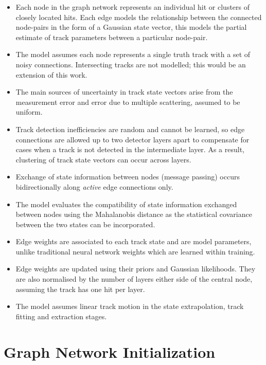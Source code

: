 \begin{itemize}
    \item Each node in the graph network represents an individual hit or clusters of closely located hits. Each edge models the relationship between the connected node-pairs in the form of a Gaussian state vector, this models the partial estimate of track parameters between a particular node-pair. 
    \item The model assumes each node represents a single truth track with a set of noisy connections. Intersecting tracks are not modelled; this would be an extension of this work.
    \item The main sources of uncertainty in track state vectors arise from the measurement error and error due to multiple scattering, assumed to be uniform.
    \item Track detection inefficiencies are random and cannot be learned, so edge connections are allowed up to two detector layers apart to compensate for cases when a track is not detected in the intermediate layer. As a result, clustering of track state vectors can occur across layers.
    \item Exchange of state information between nodes (message passing) occurs bidirectionally along \textit{active} edge connections only. 
    \item The model evaluates the compatibility of state information exchanged between nodes using the Mahalanobis distance as the statistical covariance between the two states can be incorporated.
    \item Edge weights are associated to each track state and are model parameters, unlike traditional neural network weights which are learned within training.
    \item Edge weights are updated using their priors and Gaussian likelihoods. They are also normalised by the number of layers either side of the central node, assuming the track has one hit per layer.
    \item The model assumes linear track motion in the state extrapolation, track fitting and extraction stages.

\end{itemize}



\section{Graph Network Initialization}
\label{gnn-network-initialization}


